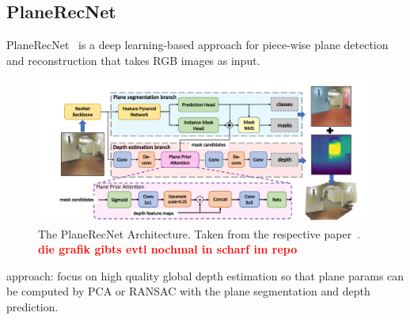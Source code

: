 \documentclass[main.tex]{subfiles}
\begin{document}
\subsection{PlaneRecNet}
PlaneRecNet~\cite{Xie_Shu_Rambach_Pagani_Stricker_2022} is a deep learning-based approach for piece-wise plane detection and reconstruction that takes RGB images
as input.
\begin{figure}[H]
    \centering
    \includegraphics[width=\textwidth]{images/planerecnet.png}
    \caption[PlaneRecNet Architecture]{The PlaneRecNet Architecture. Taken from the respective paper~\cite{Xie_Shu_Rambach_Pagani_Stricker_2022}.
        \textbf{\textcolor{red}{die grafik gibts evtl nochmal in scharf im repo}}}
\end{figure}

approach:
focus on high quality global depth estimation so that plane params can be computed by PCA or RANSAC with the plane
segmentation and depth prediction.
\end{document}
